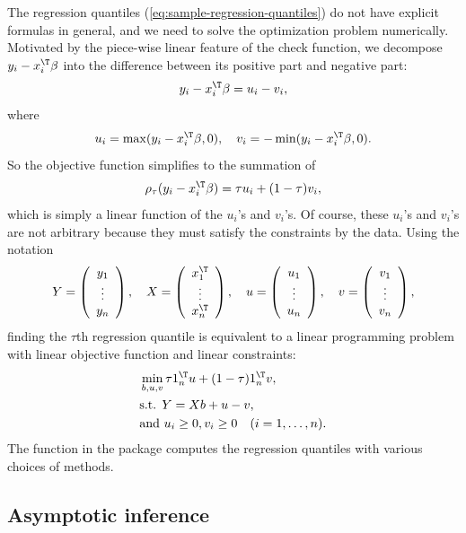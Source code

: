 The regression quantiles (\ref{eq:sample-regression-quantiles}) do
not have explicit formulas in general, and we need to solve the optimization
problem numerically. Motivated by the piece-wise linear feature of
the check function, we decompose $y_{i}-x_{i}^{\T}\beta$ into the
difference between its positive part and negative part:
\[
y_{i}-x_{i}^{\T}\beta=u_{i}-v_{i},
\]
where 
\[
u_{i}=\max(y_{i}-x_{i}^{\T}\beta,0),\quad v_{i}=-\min(y_{i}-x_{i}^{\T}\beta,0).
\]
So the objective function simplifies to the summation of 
\[
\rho_{\tau}(y_{i}-x_{i}^{\T}\beta)=\tau u_{i}+(1-\tau)v_{i},
\]
which is simply a linear function of the $u_{i}$'s and $v_{i}$'s.
Of course, these $u_{i}$'s and $v_{i}$'s are not arbitrary because
they must satisfy the constraints by the data. Using the notation
\[
Y=\left(\begin{array}{c}
y_{1}\\
\vdots\\
y_{n}
\end{array}\right),\quad X=\left(\begin{array}{c}
x_{1}^{\T}\\
\vdots\\
x_{n}^{\T}
\end{array}\right),\quad u=\left(\begin{array}{c}
u_{1}\\
\vdots\\
u_{n}
\end{array}\right),\quad v=\left(\begin{array}{c}
v_{1}\\
\vdots\\
v_{n}
\end{array}\right),
\]
finding the $\tau$th regression quantile is equivalent to a linear
programming problem with linear objective function and linear constraints:
\begin{align*}
 & \min_{b,u,v}  \tau1_{n}^{\T}u+(1-\tau)1_{n}^{\T}v  ,\\
 & \text{s.t. }Y=Xb+u-v,\\
 &\text{and } u_i \geq  0, v_i \geq  0 \quad  (i=1,\ldots, n).
\end{align*}
The function  in the  package  computes the regression quantiles with various choices of methods. 

\subsection{Asymptotic inference}

